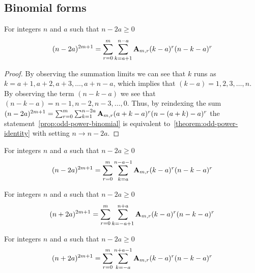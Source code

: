 \subsection{Binomial forms}\label{subsec:binomial-forms}
\begin{proposition}
    \label{prop:odd-power-binomial}
    For integers $n$ and $a$ such that $n-2a \geq 0$
    \begin{align*}
    (n-2a)
        ^{2m+1} = \sum_{r=0}^{m} \sum_{k=a+1}^{n-a} {\mathbf{A}} \sb{m,r} (k-a)^r (n-k-a)^r
    \end{align*}
    \begin{proof}
        By observing the summation limits we can see that $k$ runs as $k=a+1,a+2,a+3,\ldots,a+n-a$, which
        implies that $(k-a)=1,2,3,\ldots, n$.
        By observing the term $(n-k-a)$ we see that $(n-k-a)=n-1,n-2,n-3,\ldots,0$.
        Thus, by reindexing the sum
        $(n-2a)^{2m+1} = \sum_{r=0}^{m} \sum_{k=1}^{n-2a} {\mathbf{A}} \sb{m,r} (a+k-a)^r (n-(a+k)-a)^r$
        the statement~\eqref{prop:odd-power-binomial} is equivalent to~\eqref{theorem:odd-power-identity}
        with setting $n \rightarrow n-2a$.
    \end{proof}
\end{proposition}

\begin{corollary}
    \label{prop:odd-power-binomial-shifted}
    For integers $n$ and $a$ such that $n-2a \geq 0$
    \begin{align*}
    (n-2a)
        ^{2m+1} = \sum_{r=0}^{m} \sum_{k=a}^{n-a-1} {\mathbf{A}} \sb{m,r} (k-a)^r (n-k-a)^r
    \end{align*}
\end{corollary}

\begin{corollary}
    \label{prop:odd-power-binomial-plus}
    For integers $n$ and $a$ such that $n-2a \geq 0$
    \begin{align*}
    (n+2a)^{2m+1} = \sum_{r=0}^{m} \sum_{k=-a+1}^{n+a} {\mathbf{A}} \sb{m,r} (k-a)^r (n-k-a)^r
    \end{align*}
\end{corollary}

\begin{corollary}
    \label{prop:odd-power-binomial-plus-shifted}
    For integers $n$ and $a$ such that $n-2a \geq 0$
    \begin{align*}
    (n+2a)^{2m+1} = \sum_{r=0}^{m} \sum_{k=-a}^{n+a-1} {\mathbf{A}} \sb{m,r} (k-a)^r (n-k-a)^r
    \end{align*}
\end{corollary}
